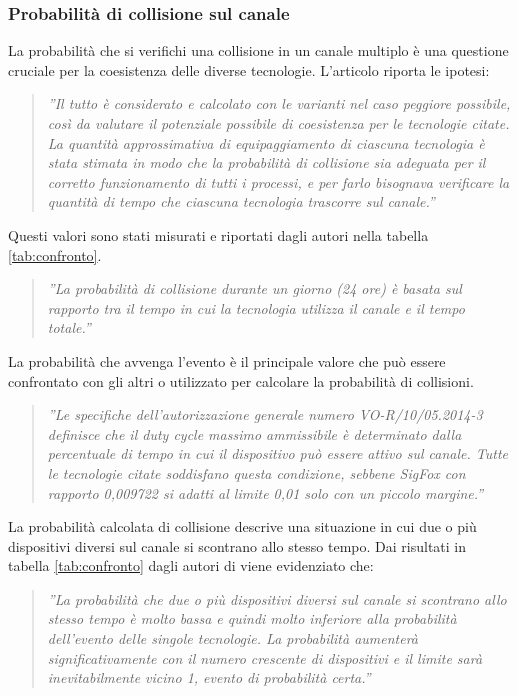 \documentclass[a4paper]{report} %
\begin{document}
\subsubsection{Probabilità di collisione sul canale}
La probabilità che si verifichi una collisione in un canale multiplo è una questione cruciale per la coesistenza delle diverse tecnologie. L'articolo \cite{art:rif.46} riporta le ipotesi:
\begin{quote}
	\textit{''Il tutto è considerato e calcolato con le varianti nel caso peggiore possibile, così da valutare il potenziale possibile di coesistenza per le tecnologie citate. La quantità approssimativa di equipaggiamento di ciascuna tecnologia è stata stimata in modo che la probabilità di collisione sia adeguata per il corretto funzionamento di tutti i processi, e per farlo bisognava verificare la quantità di tempo che ciascuna tecnologia trascorre sul canale.''}
\end{quote}
Questi valori sono stati misurati e riportati dagli autori nella tabella \ref{tab:confronto}. 
\begin{quote}
	\textit{''La probabilità di collisione durante un giorno (24 ore) è basata sul rapporto tra il tempo in cui la tecnologia utilizza il canale e il tempo totale.''}
\end{quote}
La probabilità che avvenga l'evento è il principale valore che può essere confrontato con gli altri o utilizzato per calcolare la probabilità di collisioni. 
\begin{quote}
	\textit{''Le specifiche dell'autorizzazione generale numero VO-R/10/05.2014-3 definisce che il duty cycle massimo ammissibile è determinato dalla percentuale di tempo in cui il dispositivo può essere attivo sul canale. Tutte le tecnologie citate soddisfano questa condizione, sebbene SigFox con rapporto 0,009722 si adatti al limite 0,01 solo con un piccolo margine.''}
\end{quote}
La probabilità calcolata di collisione descrive una situazione in cui due o più dispositivi diversi sul canale si scontrano allo stesso tempo. Dai risultati in tabella \ref{tab:confronto} dagli autori di \cite{art:rif.46} viene evidenziato che: 
\begin{quote}
	\textit{''La probabilità che due o più dispositivi diversi sul canale si scontrano allo stesso tempo è molto bassa e quindi molto inferiore alla probabilità dell'evento delle singole tecnologie. La probabilità aumenterà significativamente con il numero crescente di dispositivi e il limite sarà inevitabilmente vicino 1, evento di probabilità certa.''}
\end{quote}
\end{document}
